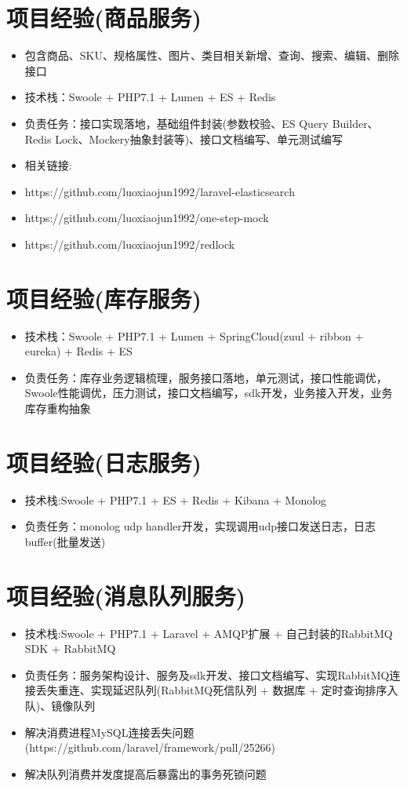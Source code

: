 \documentclass[a4paper,12pt]{article}
\begin{document}
\begin{CJK}{UTF8}{gbsn}
		\section{项目经验(商品服务)}
			\begin{itemize}
				\item{包含商品、SKU、规格属性、图片、类目相关新增、查询、搜索、编辑、删除接口}
				\item{技术栈：Swoole + PHP7.1 + Lumen + ES + Redis}
				\item{负责任务：接口实现落地，基础组件封装(参数校验、ES Query Builder、Redis Lock、Mockery抽象封装等)、接口文档编写、单元测试编写}
				\item{相关链接:}
				\item{https://github.com/luoxiaojun1992/laravel-elasticsearch}
				\item{https://github.com/luoxiaojun1992/one-step-mock}
				\item{https://github.com/luoxiaojun1992/redlock}
			\end{itemize}
			
		\section{项目经验(库存服务)}
			\begin{itemize}
				\item{技术栈：Swoole + PHP7.1 + Lumen + SpringCloud(zuul + ribbon + eureka) + Redis + ES}
				\item{负责任务：库存业务逻辑梳理，服务接口落地，单元测试，接口性能调优，Swoole性能调优，压力测试，接口文档编写，sdk开发，业务接入开发，业务库存重构抽象}
			\end{itemize}
			
		\section{项目经验(日志服务)}
			\begin{itemize}
				\item{技术栈:Swoole  + PHP7.1 + ES + Redis + Kibana + Monolog}
				\item{负责任务：monolog udp handler开发，实现调用udp接口发送日志，日志buffer(批量发送)}
			\end{itemize}
			
		\section{项目经验(消息队列服务)}
			\begin{itemize}
				\item{技术栈:Swoole + PHP7.1 + Laravel + AMQP扩展 + 自己封装的RabbitMQ SDK + RabbitMQ}
				\item{负责任务：服务架构设计、服务及sdk开发、接口文档编写、实现RabbitMQ连接丢失重连、实现延迟队列(RabbitMQ死信队列 + 数据库 + 定时查询排序入队)、镜像队列}
				\item{解决消费进程MySQL连接丢失问题(https://github.com/laravel/framework/pull/25266)}
				\item{解决队列消费并发度提高后暴露出的事务死锁问题}
			\end{itemize}
		

\end{CJK}
\end{document}
